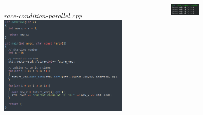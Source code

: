 \begin{frame}
\begin{columns}
	\begin{figure}
		{\centering\small\textit{race-condition-parallel.cpp}}
		\includegraphics[width=\textwidth]{img/race-cond-par.png}
	\end{figure}
	\vspace*{-15pt}
	\begin{figure}
		\includegraphics[width=0.7\textwidth]{img/race-cond-par-output.png}
	\end{figure}
	
\end{columns}

\end{frame}